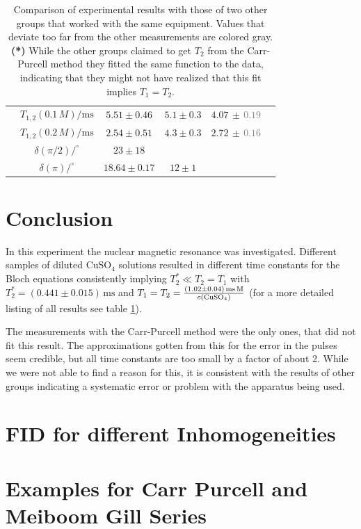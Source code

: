 \documentclass[a4paper]{scrartcl}
\numberwithin{equation}{section}
\numberwithin{figure}{section}
\numberwithin{table}{section}
\begin{document}
\begin{table}[!tbh]
\begin{tabular}{cccccc}
& $T_{1,2}(0.1\,M) / \text{ms}$ & $5.51\pm 0.46$ & $5.1\pm 0.3$ & $4.07\,\pm\,$\textcolor{Gray}{$0.19$} \\
& $T_{1,2}(0.2\,M) / \text{ms}$ & $2.54\pm 0.51$ & $4.3\pm 0.3$ & $2.72\,\pm\,$\textcolor{Gray}{$0.16$} \\
& $\delta(\pi/2) / ^\circ$ & $23 \pm 18$ & & \\
& $\delta(\pi) / ^\circ$ & $18.64\pm 0.17$ & $12\pm 1$ & \\
\midrule
\bottomrule
\end{tabular}
\caption{\small Comparison of experimental results with those of two other groups that worked with the same equipment. Values that deviate too far from the other measurements are colored gray. \textbf{(*)} While the other groups claimed to get $T_2$ from the Carr-Purcell method they fitted the same function to the data, indicating that they might not have realized that this fit implies $T_1=T_2$. }
\label{tab:compare}
\end{table}


\section{Conclusion}
In this experiment the nuclear magnetic resonance was investigated. Different samples of diluted CuSO$_4$ solutions resulted in different time constants for the Bloch equations consistently implying $T_2^* \ll T_2 = T_1$ with $T_2^*=(0.441\pm 0.015)\,\text{ms}$ and $T_1=T_2= \frac{(1.02\pm 0.04)\,\text{ms\,M}}{c(\text{CuSO}_4)}$ (for a more detailed listing of all results see table \ref{tab:compare}).

The measurements with the Carr-Purcell method were the only ones, that did not fit this result. The approximations gotten from this for the error in the pulses seem credible, but all time constants are too small by a factor of about 2. While we were not able to find a reason for this, it is consistent with the results of other groups indicating a systematic error or problem with the apparatus being used.


\FloatBarrier
\clearpage
 



\clearpage
\appendix
\section{FID for different Inhomogeneities}
\section{Examples for Carr Purcell and Meiboom Gill Series}
\end{document}
